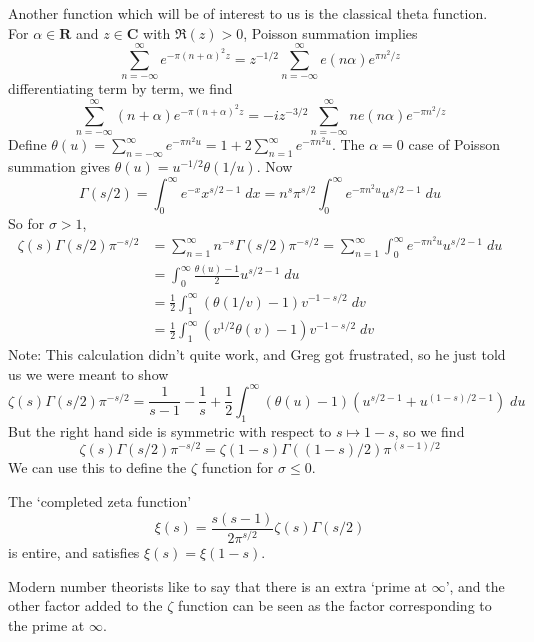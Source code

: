 Another function which will be of interest to us is the classical theta function. For $\alpha \in \mathbf{R}$ and $z \in \mathbf{C}$ with $\Re(z) > 0$, Poisson summation implies
%
\[ \sum_{n = -\infty}^\infty e^{- \pi (n + \alpha)^2 z} = z^{-1/2} \sum_{n = -\infty}^\infty e(n\alpha) e^{\pi n^2/z} \]
%
differentiating term by term, we find
%
\[ \sum_{n = -\infty}^\infty (n + \alpha) e^{- \pi  (n + \alpha)^2 z} = - iz^{-3/2} \sum_{n = -\infty}^\infty n e(n\alpha) e^{- \pi n^2/z} \]
%
Define $\theta(u) = \sum_{n = -\infty}^\infty e^{- \pi n^2 u} = 1 + 2 \sum_{n = 1}^\infty e^{- \pi n^2 u}$. The $\alpha = 0$ case of Poisson summation gives $\theta(u) = u^{-1/2} \theta(1/u)$. Now
%
\[ \Gamma(s/2) = \int_0^\infty e^{-x} x^{s/2 - 1}\; dx = n^s \pi^{s/2} \int_0^\infty e^{- \pi n^2 u} u^{s/2 - 1}\; du \]
%
So for $\sigma > 1$,
%
\begin{align*}
    \zeta(s) \Gamma(s/2) \pi^{-s/2} &= \sum_{n = 1}^\infty n^{-s} \Gamma(s/2) \pi^{-s/2} = \sum_{n = 1}^\infty \int_0^\infty e^{- \pi n^2 u} u^{s/2 - 1}\; du\\
    &= \int_0^\infty \frac{\theta(u) - 1}{2} u^{s/2 - 1}\; du\\
    &= \frac{1}{2} \int_1^\infty (\theta(1/v) - 1) v^{-1-s/2}\; dv\\
    &= \frac{1}{2} \int_1^\infty (v^{1/2} \theta(v) - 1) v^{-1-s/2}\; dv
\end{align*}
%
Note: This calculation didn't quite work, and Greg got frustrated, so he just told us we were meant to show
%
\[ \zeta(s) \Gamma(s/2) \pi^{-s/2} = \frac{1}{s - 1} - \frac{1}{s} + \frac{1}{2} \int_1^\infty (\theta(u) - 1)(u^{s/2 - 1} + u^{(1-s)/2 - 1})\; du \]
%
But the right hand side is symmetric with respect to $s \mapsto 1 - s$, so we find
%
\[ \zeta(s) \Gamma(s/2) \pi^{-s/2} = \zeta(1 - s) \Gamma((1 - s)/2) \pi^{(s-1)/2} \]
%
We can use this to define the $\zeta$ function for $\sigma \leq 0$.

\begin{corollary}
    The `completed zeta function'
    \[ \xi(s) = \frac{s(s-1)}{2 \pi^{s/2}} \zeta(s) \Gamma(s/2) \]
    is entire, and satisfies $\xi(s) = \xi(1-s)$.
\end{corollary}

\begin{remark}
    Modern number theorists like to say that there is an extra `prime at $\infty$', and the other factor added to the $\zeta$ function can be seen as the factor corresponding to the prime at $\infty$.
\end{remark}

